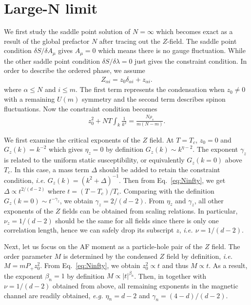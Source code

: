 \documentclass[aps,twocolumn,superscriptaddress]{revtex4-1}
\newcommand{\bea}{\begin{eqnarray}}
\newcommand{\eea}{\end{eqnarray}}
\newcommand{\ie}{\textit{i.e.{ }}}
\newcommand{\eg}{\textit{e.g.{ }}}
\begin{document}
\section{Large-N limit}
We first study the saddle point solution of $N=\infty$ which becomes exact as a result of the global
prefactor $N$ after tracing out the $Z$-field. The saddle point condition $\delta S/\delta A_\mu$ gives $A_\mu=0$ which
means there is no gauge fluctuation. While the other saddle point condition $\delta S/\delta \lambda=0$ just gives the
constraint condition. In order to describe the ordered phase, we assume \bea Z_{\alpha i}=z_0\delta_{\alpha i}+z_{\alpha
i}. \eea where $\alpha\le N$ and $i\le m$. The first term represents the condensation when $z_0\ne0$ with a remaining
$U(m)$ symmetry and the second term describes spinon fluctuations. Now the constraint condition becomes
\bea \label{eq:Ninfty} z_0^2 + NT\int_k \frac{1}{k^2} = \frac{N\rho_s}{{m(N-m)}}. \eea 

We first examine the critical exponents of the $Z$ field. At $T=T_c$, $z_0=0$ and $G_z(k)=k^{-2}$ which gives $\eta_z=0$
by definition $G_z(k)\sim k^{\eta-2}$. The exponent $\gamma_z$ is related to the uniform static susceptibility, or
equivalently $G_z(k=0)$ above $T_c$. In this case, a mass term $\Delta$ should be added to retain the constraint
condition, \ie $G_z(k)=(k^2+\Delta)^{-1}$. \cite{ma1973} Then from Eq.~\ref{eq:Ninfty}, we get $\Delta\propto t^{2/(d-2)}$ where
$t=(T-T_c)/T_c$. Comparing with the definition $G_z(k=0)\sim t^{-\gamma_z}$, we obtain $\gamma_z=2/(d-2)$. From $\eta_z$
and $\gamma_z$, all other exponents of the $Z$ fields can be obtained from scaling relations. In particular,
$\nu_z=1/(d-2)$ should be the same for all fields since there is only one correlation length, hence we can safely drop its subscript $z$, \ie
$\nu=1/(d-2)$. 

Next, let us focus on the AF moment as a particle-hole pair of the $Z$ field. The order parameter $M$ is
determined by the condensed $Z$ field by definition, \ie $M=mP_+z_0^2$. From Eq.~\ref{eq:Ninfty}, we obtain
$z_0^2\propto t$ and thus $M\propto t$. As a result, the exponent $\beta_n=1$ by definition $M\propto |t|^{\beta_n}$.
Then, in together with $\nu=1/(d-2)$ obtained from above, all remaining exponents in the magnetic channel are readily obtained, 
\eg $\eta_n=d-2$ and $\gamma_n=(4-d)/(d-2)$. 
\end{document}
